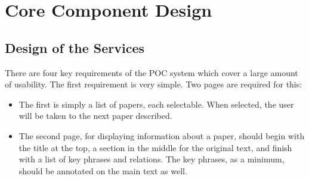 \section{Core Component Design}

\subsection*{Design of the Services}
There are four key requirements of the POC system which cover a large amount of usability. The first requirement is very simple. Two pages are required for this:
\begin{itemize}
	\item The first is simply a list of papers, each selectable. When selected, the user will be taken to the next paper described.
	\item The second page, for displaying information about a paper, should begin with the title at the top, a section in the middle for the original text, and finish with a list of key phrases and relations. The key phrases, as a minimum, should be annotated on the main text as well.
\end{itemize}

